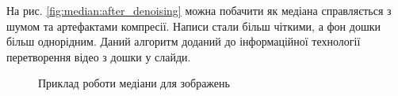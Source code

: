 На рис. \ref{fig:median:after_denoising} можна побачити як медіана справляється з шумом 
та артефактами компресії.  Написи стали більш чіткими, а фон дошки більш однорідним.
Даний алгоритм доданий до інформаційної технології перетворення відео з дошки у слайди.

\begin{figure}[H]
    \centering
    \caption{Приклад роботи медіани для зображень \cite{video:mmzi:yakovlev_discrete_math}
    }
\end{figure}

